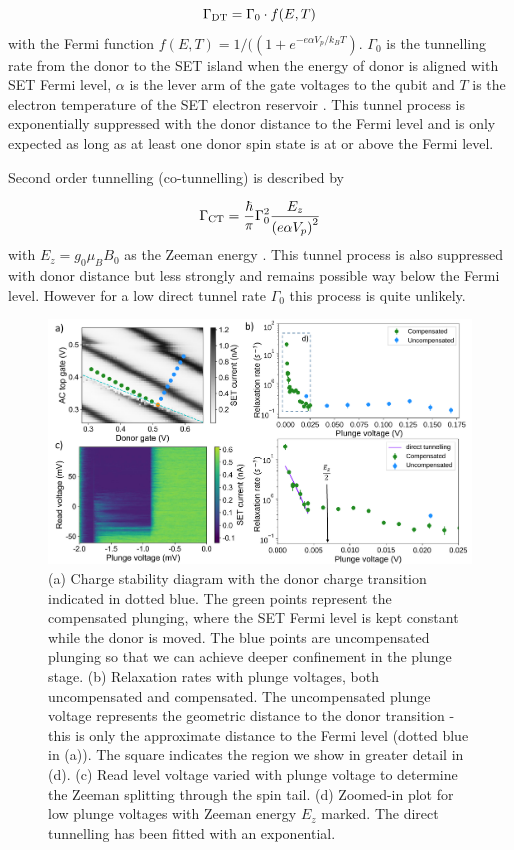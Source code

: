 \begin{equation}\label{eq:directt}
\Gamma_{\rm DT} = \Gamma_0\cdot f(E, T)
\end{equation}
with the Fermi function $f(E,T)=1/(\left(1+e^{-{e\alpha V_p}/{k_B T}}\right)$. $\Gamma_0$ is the tunnelling rate from the donor to the SET island when the energy of donor is aligned with SET Fermi level, $\alpha$ is the lever arm of the gate voltages to the qubit and $T$ is the electron temperature of the SET electron reservoir \cite{Golovach2004, MacLean2007}. This tunnel process is exponentially suppressed with the donor distance to the Fermi level and is only expected as long as at least one donor spin state is at or above the Fermi level. 

Second order tunnelling (co-tunnelling) is described by 

\begin{equation}\label{eq:cot}
\Gamma_{\rm CT} = \frac{\hbar}{\pi}\Gamma_0^2\frac{E_z}{\left(e\alpha V_p\right)^2}
\end{equation}
with $E_z=g_0\mu_B B_0$ as the Zeeman energy \cite{Quassemi2009, Lai2011, Otsuka2016}. This tunnel process is also suppressed with donor distance but less strongly and remains possible way below the Fermi level. However for a low direct tunnel rate $\Gamma_0$ this process is quite unlikely. 

\begin{figure}
\centering
\includegraphics[width=\columnwidth]{figures/fig5.pdf}
\caption{
(a) Charge stability diagram with the donor charge transition indicated in dotted blue. The green points represent the compensated plunging, where the SET Fermi level is kept constant while the donor is moved. The blue points are uncompensated plunging so that we can achieve deeper confinement in the plunge stage. (b) Relaxation rates with plunge voltages, both uncompensated and compensated. The uncompensated plunge voltage represents the geometric distance to the donor transition - this is only the approximate distance to the Fermi level (dotted blue in (a)). The square indicates the region we show in greater detail in (d). (c) Read level voltage varied with plunge voltage to determine the Zeeman splitting through the spin tail. (d) Zoomed-in plot for low plunge voltages with Zeeman energy $E_z$ marked. The direct tunnelling has been fitted with an exponential. 
}
\label{fig:plungedependence}
\end{figure}

